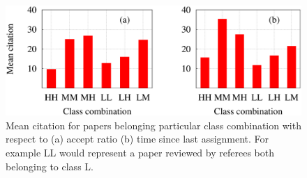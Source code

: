 \begin{figure}
 \centering
 \includegraphics[scale = 0.3]{./texfiles/Chapter_4/cikm_17/figures/ref_performance.eps}
 \caption{\label{ref_perf} Mean citation for papers belonging particular class combination with respect to (a) accept ratio (b) time since last assignment. For example LL would represent a paper reviewed by referees both 
 belonging to class L.\vspace{4mm}}
\end{figure}







\medskip
